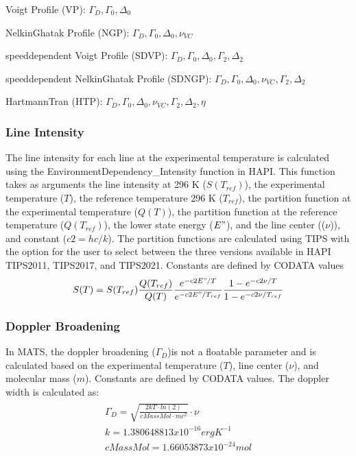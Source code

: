 \documentclass[letterpaper,10pt,english]{sphinxmanual}
\begin{document}
\sphinxAtStartPar
Voigt Profile (VP):  \(\Gamma_{D}, \Gamma_{0}, \Delta_{0}\)

\sphinxAtStartPar
Nelkin\sphinxhyphen{}Ghatak Profile (NGP):  \(\Gamma_{D}, \Gamma_{0}, \Delta_{0}, \nu_{VC}\)

\sphinxAtStartPar
speed\sphinxhyphen{}dependent Voigt Profile (SDVP):  \(\Gamma_{D}, \Gamma_{0}, \Delta_{0}, \Gamma_{2}, \Delta_{2}\)

\sphinxAtStartPar
speed\sphinxhyphen{}dependent Nelkin\sphinxhyphen{}Ghatak Profile (SDNGP):  \(\Gamma_{D}, \Gamma_{0}, \Delta_{0}, \nu_{VC}, \Gamma_{2}, \Delta_{2}\)

\sphinxAtStartPar
Hartmann\sphinxhyphen{}Tran (HTP): \(\Gamma_{D}, \Gamma_{0}, \Delta_{0}, \nu_{VC}, \Gamma_{2}, \Delta_{2}, \eta\)


\subsubsection{Line Intensity}
\label{\detokenize{MATS Summary:line-intensity}}
\sphinxAtStartPar
The line intensity for each line at the experimental temperature is calculated using the EnvironmentDependency\_Intensity function in HAPI.  This function takes as arguments the line intensity at 296 K (\(S(T_{ref})\)), the experimental temperature (\(T\)), the reference temperature 296 K (\(T_{ref}\)), the partition function at the experimental temperature (\(Q(T)\)), the partition function at the reference temperature (\(Q(T_{ref})\)), the lower state energy (\(E"\)), and the line center ((\(\nu\))), and constant (\(c2 = hc/k\)).  The partition functions are calculated using TIPS with the option for the user to select between the three versions available in HAPI TIPS2011, TIPS2017, and TIPS2021. Constants are defined by CODATA values
\begin{equation*}
\begin{split}S(T) = S(T_{ref}) \frac{Q(T_{ref})}{Q(T)}\frac{e^{-c2E"/T}}{e^{-c2E"/T_{ref}}} \frac{1 - e^{-c2\nu / T}}{1 - e^{-c2\nu / T_{ref}}}\end{split}
\end{equation*}

\subsubsection{Doppler Broadening}
\label{\detokenize{MATS Summary:doppler-broadening}}
\sphinxAtStartPar
In MATS, the doppler broadening (\(\Gamma_{D}\))is not a floatable parameter and is calculated based on the experimental temperature (\(T\)), line center (\(\nu\)), and molecular mass (\(m\)).  Constants are defined by CODATA values.  The doppler width is calculated as:
\begin{align*}\!\begin{aligned}
\Gamma_{D} = \sqrt{\frac{2kT \cdot ln(2)}{cMassMol\cdot mc^{2}}} \cdot \nu\\
k = 1.380648813 x 10^{-16} erg K^{-1}\\
cMassMol = 1.66053873x 10^{-24} mol\\
\end{aligned}\end{align*}
\end{document}
